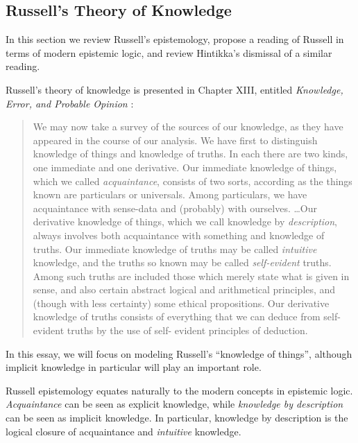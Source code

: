 \subsection{Russell's Theory of Knowledge}\label{Russell}

In this section we review Russell's epistemology, propose a reading of
Russell in
terms of modern epistemic logic, and review Hintikka's dismissal of a similar reading.

Russell's theory of knowledge is presented in Chapter XIII, entitled
\emph{Knowledge, Error, and Probable Opinion} \cite[pg. 52]{russell_problems_1936}:
\begin{quote}
We may now take a survey of the sources of our knowledge, as they have
appeared in the course of our analysis. We have first to distinguish knowledge
of things and knowledge of truths. In each there are two kinds, one immediate
and one derivative. Our immediate knowledge of things, which we called
\emph{acquaintance}, consists of two sorts, according as the things known are
particulars or universals. Among particulars, we have acquaintance with
sense-data and (probably) with ourselves.%
\ldots Our derivative knowledge of things, which we call knowledge by \emph{description},
always involves both acquaintance with something and knowledge of truths.
Our immediate knowledge of truths may be called \emph{intuitive} knowledge, and the
truths so known may be called \emph{self-evident} truths. Among such truths are
included those which merely state what is given in sense, and also certain
abstract logical and arithmetical principles, and (though with less certainty)
some ethical propositions. Our derivative knowledge of truths consists of
everything that we can deduce from self-evident truths by the use of self-
evident principles of deduction.
\end{quote}

  In this essay, we will focus on modeling Russell's ``knowledge of things'',
  although implicit knowledge in particular will play an important
  role.

  Russell epistemology equates naturally to the modern concepts in
  epistemic logic. 
  \emph{Acquaintance} can be seen as explicit knowledge, while
  \emph{knowledge by description} can be seen as implicit knowledge.
  In particular, knowledge by description is the logical closure of
  acquaintance and \emph{intuitive} knowledge.

